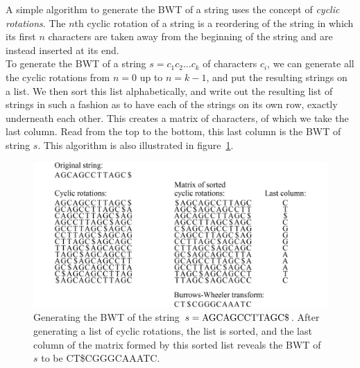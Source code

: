 \documentclass[a4paper,12pt,twoside,BCOR=10mm]{scrbook}
\begin{document}
A simple algorithm to generate the BWT of a string uses
the concept of \textit{cyclic rotations}.
The $ n $th cyclic rotation of a string is a reordering of the string in which its first $ n $ characters
are taken away from the beginning of the string and are instead inserted at its end. \\
To generate the BWT of a string $ s = c_1 c_2 ... c_k $ of characters $ c_i $,
we can generate all the cyclic rotations from $ n = 0 $ up to $ n = k - 1 $, and
put the resulting strings on a list.
We then sort this list alphabetically, and write out the resulting list of strings
in such a fashion as to have each of the strings on its own row, exactly underneath each other.
This creates a matrix of characters, of which we take the last column.
Read from the top to the bottom, this last column is the BWT of string $ s $.
This algorithm is also illustrated in figure~\ref{fig:evo_fig_bwt_with_cyclic_rotations}.

\begin{figure}[!htb]
\centering
\includegraphics[width=\textwidth]{evo_fig_bwt_with_cyclic_rotations.png}
\caption[Generating the BWT of a string]{Generating the BWT of the string $ s = \textup{AGCAGCCTTAGC\$} $. After generating a list of cyclic rotations, the list is sorted, and the last column of the matrix formed by this sorted list reveals the BWT of $ s $ to be \textup{CT\$CGGGCAAATC}.} \label{fig:evo_fig_bwt_with_cyclic_rotations}
\end{figure}
\end{document}
